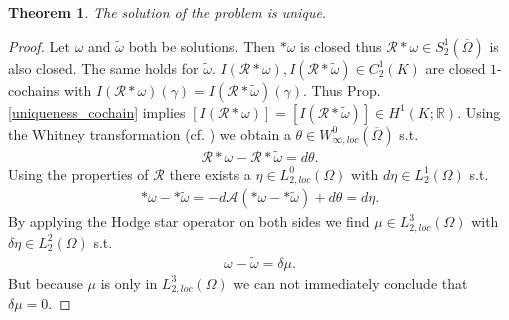 \documentclass[12pt,a4paper]{article}
\newtheorem{theorem}{Theorem}
\theoremstyle{definition}
\newcommand{\aop}{\mathscr{A}}
\newcommand{\omegabar}{\overline{\Omega}}
\newcommand{\real}{\mathbb{R}}
\newcommand{\rop}{\mathscr{R}} %
\begin{document}
\begin{theorem}
    The solution of the problem is unique.
\end{theorem}
\begin{proof}
    Let $\omega$ and $\tilde{\omega}$ both be solutions. Then $*\omega$ is 
    closed thus $\rop *\omega \in S_2^1(\omegabar)$ is also closed. The same 
    holds for $\tilde{\omega}$. 
    $I(\rop * \omega), I(\rop * \tilde{\omega}) \in C^1_2(K)$ 
    are closed $1$-cochains with
    $I(\rop * \omega)(\gamma) = I(\rop * \tilde{\omega})(\gamma)$. 
    Thus Prop.\,\ref{uniqueness_cochain} implies 
    $[I(\rop * \omega)] = [I(\rop * \tilde{\omega})] \in H^1(K;\real)$.
    Using the Whitney transformation (cf. \cite{goldshtein}) 
    we obtain a $\theta \in W_{\infty,loc}^0(\omegabar)$ s.t. 
    \begin{align*}
        \rop * \omega - \rop * \tilde{\omega} = d\theta.
    \end{align*}
    Using the 
    properties of $\rop$ there exists a $\eta \in L_{2,loc}^0(\Omega)$
    with $d\eta \in L^1_2(\Omega)$ s.t. 
    \begin{align*}
        *\omega - *\tilde{\omega} = -d\aop(*\omega - *\tilde{\omega})
        + d \theta = d\eta.
    \end{align*}
    By applying the Hodge star operator on both sides we find 
    $\mu \in L_{2,loc}^3(\Omega)$ with $\delta \eta \in L^2_2(\Omega)$ s.t.
    \begin{align}
        \omega - \tilde{\omega} = \delta \mu. \label{difference_solutions}
    \end{align}
    But because $\mu$ is only in $L_{2,loc}^3(\Omega)$ 
    we can not immediately conclude that $\delta \mu = 0$.


\end{proof}
\end{document}
